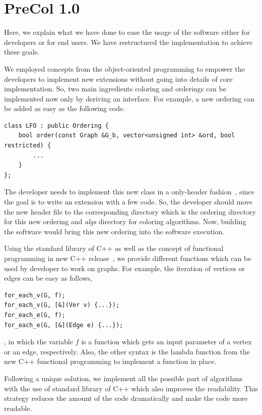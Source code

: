 \documentclass[12pt, oneside]{book}
\begin{document}
\section{PreCol 1.0}%
\label{s.extend}
Here, we explain what we have done to ease the usage of the software
either for developers or for end users. We have restructured the implementation
to achieve these goals. 

We employed concepts from the object-oriented programming to empower
the developers to implement new extensions without going into 
details of core implementation. So, two main ingredients coloring
and orderings can be implemented now only by deriving an interface.
For example, a new ordering can be added as easy as the following code.
\begin{lstlisting}
class LFO : public Ordering {
    bool order(const Graph &G_b, vector<unsigned int> &ord, bool restricted) {
        ...
    }
};
\end{lstlisting}
The developer needs to implement this new class in a only-header fashion~\cite{headeronly},
since the goal is to write an extension with a few code. So, the developer should
move the new header file to the corresponding directory which is the ordering directory
for this new ordering and \textit{algs} directory for coloring algorithms.
Now, building the software would bring this new ordering into the software execution.

Using the standard library of C++ as well as the concept of functional programming
in new C++ release~\cite{Sutherland2015}, we provide different functions which can be used
by developer to work on graphs. For example, the iteration of vertices
or edges can be easy as follows,
\begin{lstlisting}
for_each_v(G, f);
for_each_v(G, [&](Ver v) {...});
for_each_e(G, f);
for_each_e(G, [&](Edge e) {...});
\end{lstlisting}
, in which the variable $f$ is a function which gets an input parameter
of a vertex or an edge, respectively.
Also, the other syntax is the lambda function 
from the new C++ functional programming to implement a function in place.

Following a unique solution, we implement all the possible part of algorithms
with the use of standard library of C++ which also improves the readability.
This strategy reduces the amount of the code dramatically and
make the code more readable.
\end{document}
